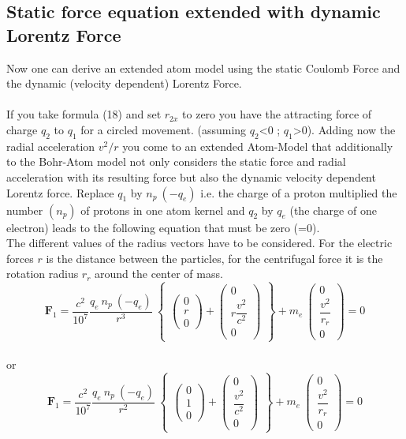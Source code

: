 \documentclass[10pt,titlepage]{article}
\begin{document}
\subsection{Static force equation extended with dynamic Lorentz Force}
Now one can derive an extended atom model using the static Coulomb Force and the dynamic (velocity dependent)  Lorentz Force.
\\
\\
If you take formula (18) and set $r_{2x}$ to zero you have the attracting force of charge $q_2$ to $q_1$ for a circled movement. (assuming  $q_2$<0 ; $q_1$>0).
Adding now the radial acceleration $v^2/r$ you come to an extended Atom-Model that additionally to the Bohr-Atom model not only considers the static force and radial acceleration with its resulting force but also the dynamic velocity dependent Lorentz force. Replace $q_1$ by $n_p \ (-q_e)$ i.e. the charge of a proton multiplied the number $(n_p)$ of protons in one atom kernel and $q_2$ by $q_e$ (the charge of one electron)
leads to the following equation that must be zero (=0).
\\
The different values of the radius vectors have to be considered. For the electric forces $r$ is the distance  between the particles, for the centrifugal force it is the rotation radius $r_r$ around the center of mass.
\begin{equation}
\textbf{$\textbf{F}_1$}=\frac{c^2}{10^7}\dfrac{q_e \ n_p \ (-q_e)}{r^3} \ 
\begin{Bmatrix}
\begin{pmatrix}0 \\ r\\0\end{pmatrix}+
\begin{pmatrix}0 \\	r\dfrac{v^2}{c^2} \\0\end{pmatrix}
\end{Bmatrix} +
m_e  \ 
\begin{pmatrix}0 \\
	\dfrac{v^2}{r_r} \\0\end{pmatrix}=0
\end{equation}
\\or
\begin{equation}
\textbf{$\textbf{F}_1$}=\frac{c^2}{10^7}\dfrac{q_e \ n_p \ (-q_e)}{r^2} \ 
\begin{Bmatrix}
\begin{pmatrix}0 \\ 1\\0\end{pmatrix}+
\begin{pmatrix}0 \\	\dfrac{v^2}{c^2} \\0\end{pmatrix}
\end{Bmatrix} +
m_e  \ 
\begin{pmatrix}0 \\	\dfrac{v^2}{r_r} \\0\end{pmatrix}
=0
\end{equation}
\end{document}
